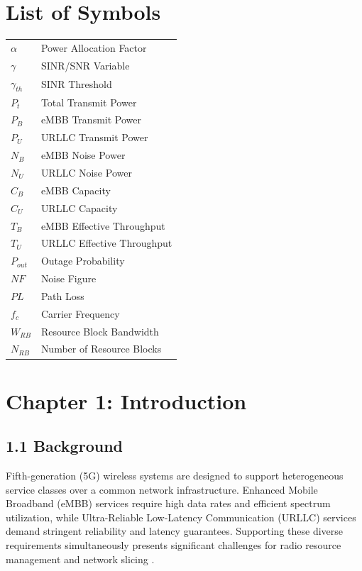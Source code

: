 \documentclass[
]{article}
\begin{document}
\section*{List of Symbols}

\begin{tabular}{p{} p{}}
$\alpha$ & Power Allocation Factor \\
$\gamma$ & SINR/SNR Variable \\
$\gamma_{th}$ & SINR Threshold \\
$P_t$ & Total Transmit Power \\
$P_B$ & eMBB Transmit Power \\
$P_U$ & URLLC Transmit Power \\
$N_B$ & eMBB Noise Power \\
$N_U$ & URLLC Noise Power \\
$C_B$ & eMBB Capacity \\
$C_U$ & URLLC Capacity \\
$T_B$ & eMBB Effective Throughput \\
$T_U$ & URLLC Effective Throughput \\
$P_{out}$ & Outage Probability \\
$NF$ & Noise Figure \\
$PL$ & Path Loss \\
$f_c$ & Carrier Frequency \\
$W_{RB}$ & Resource Block Bandwidth \\
$N_{RB}$ & Number of Resource Blocks \\
\end{tabular}
\clearpage


\section{Chapter 1: Introduction}\label{chapter-1-introduction}

\subsection{1.1 Background}\label{background}

Fifth-generation (5G) wireless systems are designed to support heterogeneous service classes over a common network infrastructure. Enhanced Mobile Broadband (eMBB) services require high data rates and efficient spectrum utilization, while Ultra-Reliable Low-Latency Communication (URLLC) services demand stringent reliability and latency guarantees. Supporting these diverse requirements simultaneously presents significant challenges for radio resource management and network slicing \parencite{Popovski2018}.
\end{document}
